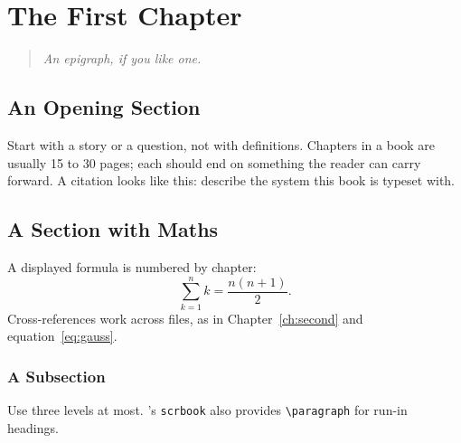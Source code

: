 \chapter{The First Chapter}\label{ch:first}

\begin{quote}\itshape
An epigraph, if you like one.
\end{quote}

\section{An Opening Section}
Start with a story or a question, not with definitions. Chapters in a book are
usually 15 to 30 pages; each should end on something the reader can carry forward.
A citation looks like this: \textcite{lamport94} describe the system this book is typeset with.

\section{A Section with Maths}
A displayed formula is numbered by chapter:
\begin{equation}
  \sum_{k=1}^{n} k = \frac{n(n+1)}{2}.
  \label{eq:gauss}
\end{equation}
Cross-references work across files, as in Chapter~\ref{ch:second} and equation~\eqref{eq:gauss}.

\subsection{A Subsection}
Use three levels at most. \KOMAScript's \texttt{scrbook} also provides \verb|\paragraph|
for run-in headings.
